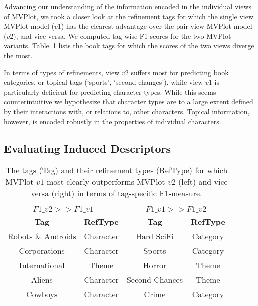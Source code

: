 \documentclass[11pt,letterpaper]{article}
\begin{document}
Advancing our understanding of the information encoded in the individual views of MVPlot, we took a closer look at the refinement tags for which the single view MVPlot model ($v1$) has the clearest advantage over the pair view MVPlot model ($v2$), and vice-versa. We computed tag-wise F1-scores for the two MVPlot variants. Table~\ref{tab-toptags} lists the book tags for which the scores of the two views diverge the most.

In terms of types of refinements, view $v2$ suffers most for predicting book categories, or topical tags (`sports', `second changes'), while view $v1$ is particularly deficient for predicting character types. While this seems counterintuitive we hypothesize that character types are to a large extent defined by their interactions with, or relations to, other characters. Topical information, however, is encoded robustly in the properties of individual characters.

\subsection{Evaluating Induced Descriptors}
\label{ssec-mturk}

\begin{table}
 \setlength{\tabcolsep}{3pt} %
 \begin{small}\begin{tabular}{|cc|cc|}
 \hline
  \multicolumn{2}{|c|}{$F1\_v2 >> F1\_v1$} & \multicolumn{2}{c|}{$F1\_v1 >> F1\_v2$} \\
{\bf Tag} & {\bf RefType} & {\bf Tag} & {\bf RefType} \\\hline
Robots \& Androids & Character & Hard SciFi & Category\\
Corporations & Character &    Sports & Category\\
International & Theme &  Horror & Theme\\
Aliens & Character & Second Chances & Theme\\
Cowboys & Character & Crime & Category\\\hline

 
 \end{tabular}\end{small}
 \caption{The tags (Tag) and their refinement types (RefType) for which MVPlot $v1$ most clearly outperforms MVPlot $v2$ (left) and vice versa (right) in terms of tag-specific F1-measure.}
 \label{tab-toptags}
\end{table}
\end{document}
